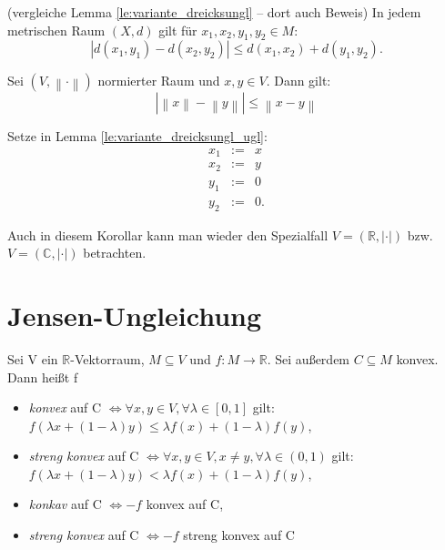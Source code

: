 \documentclass[10pt]{scrbook}
\begin{document}
\begin{Le}
\label{le:variante_dreicksungl_ugl}
(vergleiche Lemma \ref{le:variante_dreicksungl} -- dort auch Beweis)
In jedem metrischen Raum $(X, d)$ gilt für $x_1, x_2, y_1, y_2\in M$:
\begin{equation}
	\left|d(x_1, y_1)-d(x_2, y_2)\right|\leq d(x_1, x_2)+d(y_1, y_2).
\end{equation}
\end{Le}

\begin{Kor}
Sei $(V, \left\|\cdot\right\|)$ normierter Raum und $x, y\in V$. Dann gilt:
\begin{equation}
\left|\left\|x\right\|-\left\|y\right\|\right| \leq \left\|x-y\right\|
\end{equation}
\end{Kor}
\begin{bew}
Setze in Lemma \ref{le:variante_dreicksungl_ugl}:
\begin{eqnarray*}
x_1 & := & x \\
x_2 & := & y \\
y_1 & := & 0 \\
y_2 & := & 0.
\end{eqnarray*}
\end{bew}

Auch in diesem Korollar kann man wieder den Spezialfall $V=(\mathbb{R}, \left|\cdot\right|)$ bzw. $V=(\mathbb{C}, \left|\cdot\right|)$ betrachten.

\section{Jensen-Ungleichung}

\begin{Def}
\label{def:konvexe_fkt}
Sei V ein $\mathbb{R}$-Vektorraum, $M\subseteq V$ und $f: M\rightarrow \mathbb{R}$. Sei außerdem $C\subseteq M$ konvex. Dann heißt f
\begin{itemize}
\item \emph{konvex} auf C $\Leftrightarrow \forall x, y\in V, \forall \lambda \in\left[0, 1\right]$ gilt: $f(\lambda x+\left(1-\lambda\right) y) \leq \lambda f(x)+\left(1-\lambda\right) f(y)$,
\item \emph{streng konvex} auf C $\Leftrightarrow \forall x, y\in V, x\neq y, \forall \lambda \in\left(0, 1\right)$ gilt: $f(\lambda x+\left(1-\lambda\right) y) < \lambda f(x)+\left(1-\lambda\right) f(y)$,
\item \emph{konkav} auf C $\Leftrightarrow -f$ konvex auf C,
\item \emph{streng konvex} auf C $\Leftrightarrow -f$ streng konvex auf C
\end{itemize}
\end{Def}
\end{document}
